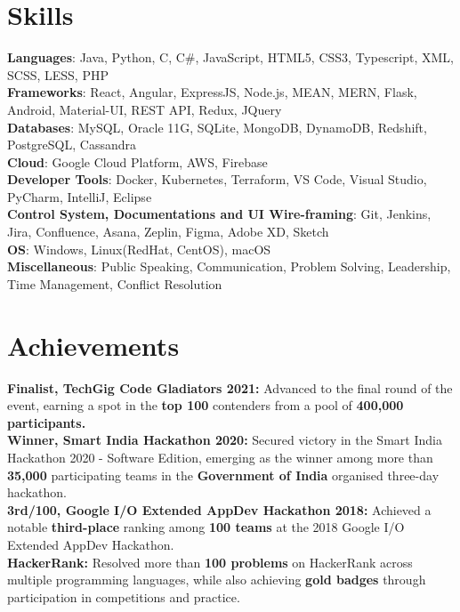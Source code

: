 \documentclass[letterpaper,11pt]{article}
\begin{document}
%
\section{Skills}
 \begin{itemize}[leftmargin=0.15in, label={}]
    \small{\item{
     \textbf{Languages}{: Java, Python, C, C\#, JavaScript, HTML5, CSS3, Typescript, XML, SCSS, LESS, PHP} \\
     \textbf{Frameworks}{: React, Angular, ExpressJS, Node.js, MEAN, MERN, Flask, Android, Material-UI, REST API, Redux, JQuery} \\
     \textbf{Databases}{: MySQL, Oracle 11G, SQLite, MongoDB, DynamoDB, Redshift, PostgreSQL, Cassandra} \\
     \textbf{Cloud}{: Google Cloud Platform, AWS, Firebase} \\
     \textbf{Developer Tools}{: Docker, Kubernetes, Terraform, VS Code, Visual Studio, PyCharm, IntelliJ, Eclipse} \\
     \textbf{Control System, Documentations and UI Wire-framing}{: Git, Jenkins, Jira, Confluence, Asana, Zeplin, Figma, Adobe XD, Sketch} \\
     \textbf{OS}{: Windows, Linux(RedHat, CentOS), macOS} \\
     \textbf{Miscellaneous}{: Public Speaking, Communication, Problem Solving, Leadership, Time Management, Conflict Resolution }
    }}
 \end{itemize}

\section{Achievements}
 \begin{itemize}[leftmargin=0.15in, label={}]
    \small{\item{
     \textbf{Finalist, TechGig Code Gladiators 2021:}{ Advanced to the final round of the event, earning a spot in the \textbf{top 100} contenders from a pool of \textbf{400,000 participants.}} \\
     \textbf{Winner, Smart India Hackathon 2020:}{ Secured victory in the Smart India Hackathon 2020 - Software Edition, emerging as the winner among more than \textbf{35,000} participating teams in the \textbf{Government of India} organised three-day hackathon.} \\
     \textbf{3rd/100, Google I/O Extended AppDev Hackathon 2018:}{ Achieved a notable \textbf{third-place} ranking among \textbf{100 teams} at the 2018 Google I/O Extended AppDev Hackathon.} \\
     \textbf{HackerRank:}{ Resolved more than \textbf{100 problems} on HackerRank across multiple programming languages, while also achieving \textbf{gold badges} through participation in competitions and practice.} \\
    }}
 \end{itemize}
\end{document}
